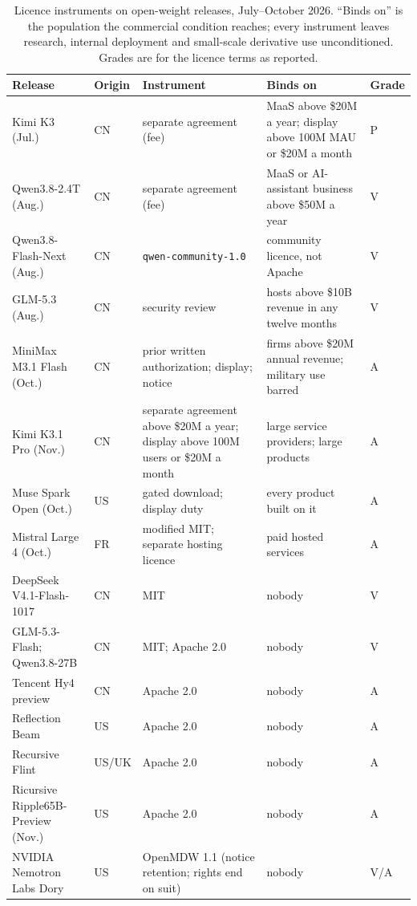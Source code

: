 \begin{table}[htbp]
  \centering\footnotesize
  \caption{Licence instruments on open-weight releases, July--October 2026. ``Binds on'' is the population the commercial condition reaches; every instrument leaves research, internal deployment and small-scale derivative use unconditioned. Grades are for the licence terms as reported.}
  \label{tab:mdl-licences}
  \begin{tabular}{@{}p{30mm}p{10mm}p{40mm}p{44mm}p{10mm}@{}}
    \toprule
    \textbf{Release} & \textbf{Origin} & \textbf{Instrument} & \textbf{Binds on} & \textbf{Grade} \\
    \midrule
    Kimi K3 (Jul.) & CN & separate agreement (fee) & MaaS above \$20M a year; display above 100M MAU or \$20M a month & P \\
    Qwen3.8-2.4T (Aug.) & CN & separate agreement (fee) & MaaS or AI-assistant business above \$50M a year & V \\
    Qwen3.8-Flash-Next (Aug.) & CN & \texttt{qwen-community-1.0} & community licence, not Apache & V \\
    GLM-5.3 (Aug.) & CN & security review & hosts above \$10B revenue in any twelve months & V \\
    MiniMax M3.1 Flash (Oct.) & CN & prior written authorization; display; notice & firms above \$20M annual revenue; military use barred & A \\
    Kimi K3.1 Pro (Nov.) & CN & separate agreement above \$20M a year; display above 100M users or \$20M a month & large service providers; large products & A \\
    Muse Spark Open (Oct.) & US & gated download; display duty & every product built on it & A \\
    Mistral Large 4 (Oct.) & FR & modified MIT; separate hosting licence & paid hosted services & A \\
    \midrule
    DeepSeek V4.1-Flash-1017 & CN & MIT & nobody & V \\
    GLM-5.3-Flash; Qwen3.8-27B & CN & MIT; Apache 2.0 & nobody & V \\
    Tencent Hy4 preview & CN & Apache 2.0 & nobody & A \\
    Reflection Beam & US & Apache 2.0 & nobody & A \\
    Recursive Flint & US/UK & Apache 2.0 & nobody & A \\
    Ricursive Ripple65B-Preview (Nov.) & US & Apache 2.0 & nobody & A \\
    NVIDIA Nemotron Labs Dory & US & OpenMDW 1.1 (notice retention; rights end on suit) & nobody & V/A \\
    \bottomrule
  \end{tabular}
\end{table}

